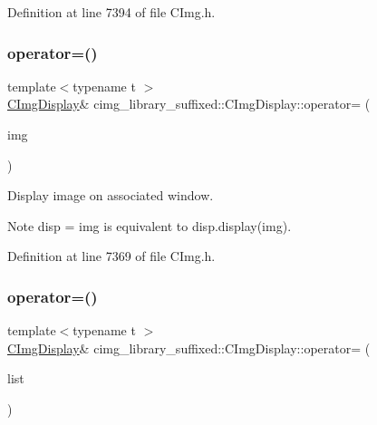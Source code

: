 Definition at line 7394 of file C\+Img.\+h.

\mbox{\label{structcimg__library__suffixed_1_1CImgDisplay_ac5f0339274799f6b5b34c7705d406b2c}} 
\subsubsection{\texorpdfstring{operator=()}{operator=()}\hspace{0.1cm}{\footnotesize\ttfamily [1/3]}}
{\footnotesize\ttfamily template$<$typename t $>$ \\
\hyperlink{structcimg__library__suffixed_1_1CImgDisplay}{C\+Img\+Display}\& cimg\+\_\+library\+\_\+suffixed\+::\+C\+Img\+Display\+::operator= (\begin{DoxyParamCaption}\item[{const \hyperlink{structcimg__library__suffixed_1_1CImg}{C\+Img}$<$ t $>$ \&}]{img }\end{DoxyParamCaption})\hspace{0.3cm}{\ttfamily [inline]}}



Display image on associated window. 

\begin{DoxyNote}{Note}
{\ttfamily disp = img} is equivalent to {\ttfamily disp.\+display(img)}. 
\end{DoxyNote}


Definition at line 7369 of file C\+Img.\+h.

\mbox{\label{structcimg__library__suffixed_1_1CImgDisplay_ab901ebd7011b508431b03635faeea838}} 
\subsubsection{\texorpdfstring{operator=()}{operator=()}\hspace{0.1cm}{\footnotesize\ttfamily [2/3]}}
{\footnotesize\ttfamily template$<$typename t $>$ \\
\hyperlink{structcimg__library__suffixed_1_1CImgDisplay}{C\+Img\+Display}\& cimg\+\_\+library\+\_\+suffixed\+::\+C\+Img\+Display\+::operator= (\begin{DoxyParamCaption}\item[{const \hyperlink{structcimg__library__suffixed_1_1CImgList}{C\+Img\+List}$<$ t $>$ \&}]{list }\end{DoxyParamCaption})\hspace{0.3cm}{\ttfamily [inline]}}



